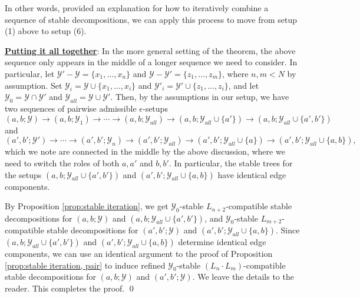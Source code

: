 \documentclass{amsart}
\theoremstyle{definition}
\theoremstyle{remark}
\theoremstyle{definition}
\newcommand{\calY}{\mathcal{Y}}
\begin{document}
In other words, provided an explanation for how to iteratively combine a sequence of stable decompositions, we can apply this process to move from setup (1) above to setup (6).

\medskip

\textbf{\underline{Putting it all together}}: In the more general setting of the theorem, the above sequence only appears in the middle of a longer sequence we need to consider.  In particular, let $\calY' - \calY = \{x_1, \dots, x_n\}$ and $\calY - \calY' = \{z_1, \dots, z_m\}$, where $n,m < N$ by assumption.  Set $\calY_i = \calY \cup \{x_1, \dots, x_i\}$ and $\calY'_i = \calY' \cup \{z_1, \dots, z_i\}$, and let $\calY_0 = \calY \cap \calY'$ and $\calY_{all} = \calY \cup \calY'$.  Then, by the assumptions in our setup, we have two sequences of pairwise admissible $\epsilon$-setups
$$(a,b;\calY) \to (a,b;\calY_1) \to \cdots \to (a,b;\calY_{all}) \to (a,b;\calY_{all} \cup \{a'\}) \to (a,b;\calY_{all} \cup \{a',b'\})$$
and
$$(a',b';\calY') \to \cdots \to (a',b'; \calY_n) \to (a',b';\calY_{all}) \to (a',b';\calY_{all} \cup \{a\}) \to (a',b';\calY_{all} \cup \{a,b\}),$$
which we note are connected in the middle by the above discussion, where we need to switch the roles of both $a,a'$ and $b,b'$.  In particular, the stable trees for the setups $(a,b;\calY_{all} \cup \{a',b'\})$ and $(a',b';\calY_{all} \cup \{a,b\})$ have identical edge components.

By Proposition \ref{prop:stable iteration}, we get $\calY_0$-stable $L_{n+2}$-compatible stable decompositions for $(a,b;\calY)$ and $(a,b;\calY_{all} \cup \{a',b'\})$, and $\calY_0$-stable $L_{m+2}$-compatible stable decompositions for $(a',b';\calY)$ and $(a',b';\calY_{all} \cup \{a,b\})$.  Since $(a,b;\calY_{all} \cup \{a',b'\})$ and $(a',b';\calY_{all} \cup \{a,b\})$ determine identical edge components, we can use an identical argument to the proof of Proposition \ref{prop:stable iteration, pair} to induce refined $\calY_0$-stable $(L_n \cdot L_m)$-compatible stable decompositions for $(a,b;\calY)$ and $(a',b';\calY)$.  We leave the details to the reader.  This completes the proof. \qed

{}


 
\end{document}
